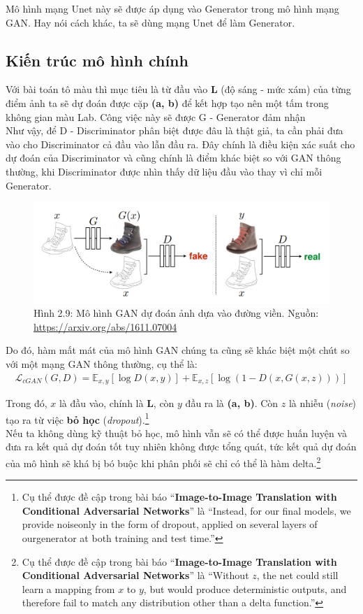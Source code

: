 \documentclass[a4paper]{article}
\begin{document}
\noindent
Mô hình mạng Unet này sẽ được áp dụng vào Generator trong mô hình mạng GAN. Hay nói cách khác, ta sẽ dùng mạng Unet để làm Generator.

\subsection{Kiến trúc mô hình chính}
Với bài toán tô màu thì mục tiêu là từ đầu vào \textbf{L} (độ sáng - mức xám) của từng điểm ảnh ta sẽ dự đoán được cặp \textbf{(a, b)} để kết hợp tạo nên một tấm trong không gian màu Lab. Công việc này sẽ được G - Generator đảm nhận\\
Như vậy, để D - Discriminator phân biệt được đâu là thật giả, ta cần phải đưa vào cho Discriminator cả đầu vào lẫn đầu ra. Đây chính là điều kiện xác suất cho dự đoán của Discriminator và cũng chính là điểm khác biệt so với GAN thông thường, khi Discriminator được nhìn thấy dữ liệu đầu vào thay vì chỉ mỗi Generator.

\begin{figure}[h!]
\centering
\includegraphics[width=13cm]{images/2_9.PNG}
\caption{Hình 2.9: Mô hình GAN dự đoán ảnh dựa vào đường viền. Nguồn: \href{https://arxiv.org/abs/1611.07004}{https://arxiv.org/abs/1611.07004}}
\end{figure}

\noindent
Do đó, hàm mất mát của mô hình GAN chúng ta cũng sẽ khác biệt một chút so với một mạng GAN thông thường, cụ thể là:
\begin{align*}
    \mathcal{L}_{cGAN}(G, D) = \mathbb{E}_{x, y}\left[\log D\left(x, y\right)\right] + \mathbb{E}_{x, z}\left[\log \left(1 - D\left(x, G\left(x, z\right)\right)\right)\right]
\end{align*}

\noindent
Trong đó, $x$ là đầu vào, chính là \textbf{L}, còn $y$ đầu ra là \textbf{(a, b)}. Còn $z$ là nhiễu (\textit{noise}) tạo ra từ việc \textbf{bỏ học} (\textit{dropout}).\footnote{Cụ thể được đề cập trong bài báo ``\textbf{Image-to-Image Translation with Conditional Adversarial Networks}'' là ``Instead, for our final models, we provide noiseonly in the form of dropout, applied on several layers of ourgenerator at both training and test time.''}\\
Nếu ta không dùng kỹ thuật bỏ học, mô hình vẫn sẽ có thể được huấn luyện và đưa ra kết quả dự đoán tốt tuy nhiên không được tổng quát, tức kết quả dự đoán của mô hình sẽ khá bị bó buộc khi phân phối sẽ chỉ có thể là hàm delta.\footnote{Cụ thể được đề cập trong bài báo ``\textbf{Image-to-Image Translation with Conditional Adversarial Networks}'' là ``Without $z$, the net could still learn a mapping from $x$ to $y$, but would produce deterministic outputs, and therefore fail to match any distribution other than a delta function.''}
\end{document}
